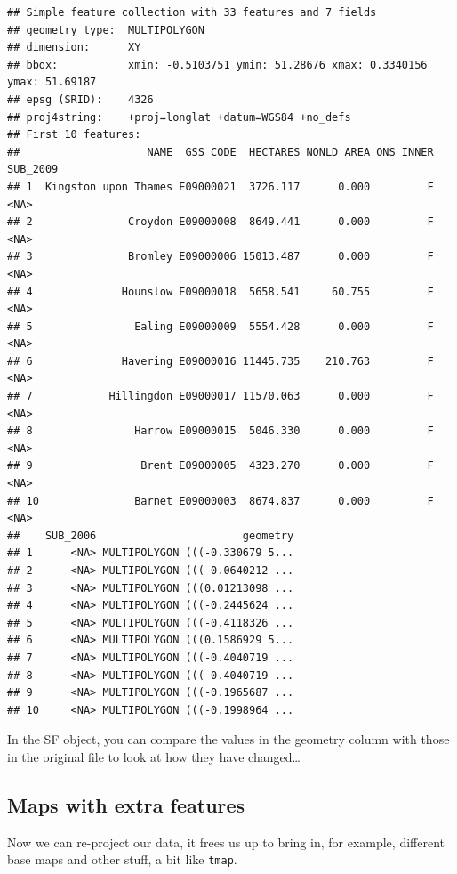 \documentclass[]{book}
\begin{document}
\begin{verbatim}
## Simple feature collection with 33 features and 7 fields
## geometry type:  MULTIPOLYGON
## dimension:      XY
## bbox:           xmin: -0.5103751 ymin: 51.28676 xmax: 0.3340156 ymax: 51.69187
## epsg (SRID):    4326
## proj4string:    +proj=longlat +datum=WGS84 +no_defs
## First 10 features:
##                    NAME  GSS_CODE  HECTARES NONLD_AREA ONS_INNER SUB_2009
## 1  Kingston upon Thames E09000021  3726.117      0.000         F     <NA>
## 2               Croydon E09000008  8649.441      0.000         F     <NA>
## 3               Bromley E09000006 15013.487      0.000         F     <NA>
## 4              Hounslow E09000018  5658.541     60.755         F     <NA>
## 5                Ealing E09000009  5554.428      0.000         F     <NA>
## 6              Havering E09000016 11445.735    210.763         F     <NA>
## 7            Hillingdon E09000017 11570.063      0.000         F     <NA>
## 8                Harrow E09000015  5046.330      0.000         F     <NA>
## 9                 Brent E09000005  4323.270      0.000         F     <NA>
## 10               Barnet E09000003  8674.837      0.000         F     <NA>
##    SUB_2006                       geometry
## 1      <NA> MULTIPOLYGON (((-0.330679 5...
## 2      <NA> MULTIPOLYGON (((-0.0640212 ...
## 3      <NA> MULTIPOLYGON (((0.01213098 ...
## 4      <NA> MULTIPOLYGON (((-0.2445624 ...
## 5      <NA> MULTIPOLYGON (((-0.4118326 ...
## 6      <NA> MULTIPOLYGON (((0.1586929 5...
## 7      <NA> MULTIPOLYGON (((-0.4040719 ...
## 8      <NA> MULTIPOLYGON (((-0.4040719 ...
## 9      <NA> MULTIPOLYGON (((-0.1965687 ...
## 10     <NA> MULTIPOLYGON (((-0.1998964 ...
\end{verbatim}

In the SF object, you can compare the values in the geometry column with those in the original file to look at how they have changed\ldots{}

\hypertarget{maps-with-extra-features}{%
\subsection{Maps with extra features}\label{maps-with-extra-features}}

Now we can re-project our data, it frees us up to bring in, for example, different base maps and other stuff, a bit like \texttt{tmap}.
\end{document}
